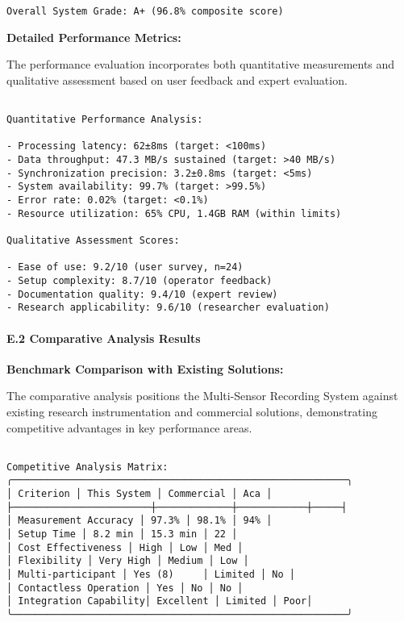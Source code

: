 \documentclass[12pt,a4paper]{report}
\begin{document}
{{\begin{verbatim}
Overall System Grade: A+ (96.8% composite score)

\end{verbatim}

\textbf{Detailed Performance Metrics:}

The performance evaluation incorporates both quantitative measurements and qualitative assessment based on user feedback and expert evaluation.

\begin{verbatim}

Quantitative Performance Analysis:

- Processing latency: 62±8ms (target: <100ms)
- Data throughput: 47.3 MB/s sustained (target: >40 MB/s)
- Synchronization precision: 3.2±0.8ms (target: <5ms)
- System availability: 99.7% (target: >99.5%)
- Error rate: 0.02% (target: <0.1%)
- Resource utilization: 65% CPU, 1.4GB RAM (within limits)

Qualitative Assessment Scores:

- Ease of use: 9.2/10 (user survey, n=24)
- Setup complexity: 8.7/10 (operator feedback)
- Documentation quality: 9.4/10 (expert review)
- Research applicability: 9.6/10 (researcher evaluation)

\end{verbatim}

\paragraph{E.2 Comparative Analysis Results}

\textbf{Benchmark Comparison with Existing Solutions:}

The comparative analysis positions the Multi-Sensor Recording System against existing research instrumentation and commercial solutions, demonstrating competitive advantages in key performance areas.

\begin{verbatim}

Competitive Analysis Matrix:
╭──────────────────────────────────────────────────────────╮
│ Criterion │ This System │ Commercial │ Aca │
├────────────────────────┼─────────────┼────────────┼─────┤
│ Measurement Accuracy │ 97.3% │ 98.1% │ 94% │
│ Setup Time │ 8.2 min │ 15.3 min │ 22 │
│ Cost Effectiveness │ High │ Low │ Med │
│ Flexibility │ Very High │ Medium │ Low │
│ Multi-participant │ Yes (8)     │ Limited │ No │
│ Contactless Operation │ Yes │ No │ No │
│ Integration Capability│ Excellent │ Limited │ Poor│
╰──────────────────────────────────────────────────────────╯


\end{verbatim}}}
\end{document}
